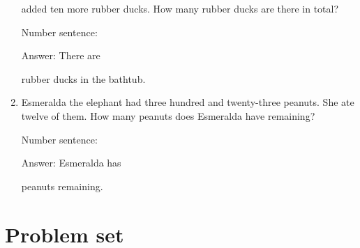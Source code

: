 \documentclass{tufte-book}
\begin{document}
\begin{enumerate}
  added ten more rubber ducks. How many rubber ducks are there in
  total?\medskip\par
  Number sentence:
  \dotfill\medskip\par
  Answer: There are
  \dotfill\medskip\par\mbox{}\dotfill\medskip\par\mbox{}\dotfill\bigskip
  rubber ducks in the bathtub.
\item
  Esmeralda the elephant had three hundred and twenty-three peanuts. She
  ate twelve of them. How many peanuts does Esmeralda have remaining?\medskip\par
  Number sentence:
  \dotfill\medskip\par
  Answer: Esmeralda has
  \dotfill\medskip\par\mbox{}\dotfill\medskip\par\mbox{}\dotfill\bigskip
  peanuts remaining.
\end{enumerate}



\clearpage\section{Problem set }
\end{document}
